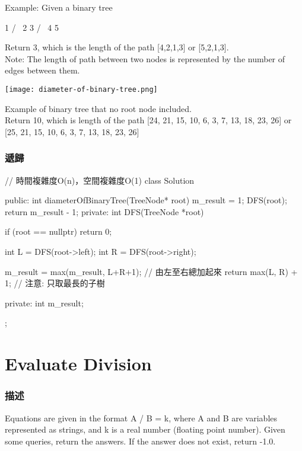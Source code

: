 Example:
Given a binary tree
\begin{Code}
          1
         / \
        2   3
       / \
      4   5

\end{Code}
Return 3, which is the length of the path [4,2,1,3] or [5,2,1,3].\\
Note: The length of path between two nodes is represented by the number of edges between them.


\begin{center}
  \texttt{[image: diameter-of-binary-tree.png]}\\
  \label{fig:diameter-of-binary-tree}
\end{center}

Example of binary tree that no root node included.\\
Return 10, which is length of the path [24, 21, 15, 10, 6, 3, 7, 13, 18, 23, 26] or [25, 21, 15, 10, 6, 3, 7, 13, 18, 23, 26]

\subsubsection{遞歸}
\begin{Code}
// 時間複雜度O(n)，空間複雜度O(1)
class Solution {
public:
    int diameterOfBinaryTree(TreeNode* root) {
        m_result = 1;
        DFS(root);
        return m_result - 1;
    }
private:
    int DFS(TreeNode *root)
    {
        if (root == nullptr) return 0;

        int L = DFS(root->left);
        int R = DFS(root->right);

        m_result = max(m_result, L+R+1); // 由左至右總加起來
        return max(L, R) + 1; // 注意: 只取最長的子樹
    }
private:
    int m_result;
};
\end{Code}

\section{Evaluate Division} %
\label{sec:evaluate-division}


\subsubsection{描述}
Equations are given in the format A / B = k, where A and B are variables represented as strings, and k is a real number (floating point number). Given some queries, return the answers. If the answer does not exist, return -1.0.


